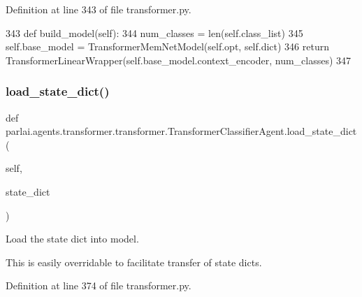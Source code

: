 Definition at line 343 of file transformer.\+py.


\begin{DoxyCode}
343     \textcolor{keyword}{def }build\_model(self):
344         num\_classes = len(self.class\_list)
345         self.base\_model = TransformerMemNetModel(self.opt, self.dict)
346         \textcolor{keywordflow}{return} TransformerLinearWrapper(self.base\_model.context\_encoder, num\_classes)
347 
\end{DoxyCode}
\mbox{\label{classparlai_1_1agents_1_1transformer_1_1transformer_1_1TransformerClassifierAgent_a939ce95291954f4cce7a1acfd101c896}} 
\subsubsection{\texorpdfstring{load\+\_\+state\+\_\+dict()}{load\_state\_dict()}}
{\footnotesize\ttfamily def parlai.\+agents.\+transformer.\+transformer.\+Transformer\+Classifier\+Agent.\+load\+\_\+state\+\_\+dict (\begin{DoxyParamCaption}\item[{}]{self,  }\item[{}]{state\+\_\+dict }\end{DoxyParamCaption})}

\begin{DoxyVerb}Load the state dict into model.

This is easily overridable to facilitate transfer of state dicts.
\end{DoxyVerb}
 

Definition at line 374 of file transformer.\+py.



